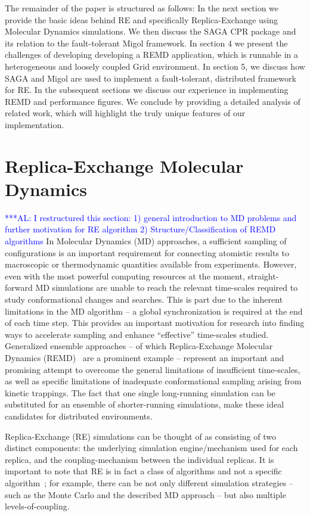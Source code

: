 \documentclass{rspublic}
\newcommand{\alnote}[1]{ {\textcolor{blue} { ***AL: #1 }}}
\newcommand{\alnote}[1]{}
\begin{document}
The remainder of the paper is structured as follows: In the next
section we provide the basic ideas behind RE and specifically
Replica-Exchange using Molecular Dynamics simulations.  We then
discuss the SAGA CPR package and its relation to the  fault-tolerant 
Migol framework. In section 4 we present
the challenges of developing developing a REMD application, which is runnable in 
a heterogeneous and loosely coupled Grid environment.
In section 5, we discuss how SAGA and Migol are used to implement 
a fault-tolerant, distributed framework for RE. In the subsequent sections we discuss
our experience in implementing REMD and performance figures. We
conclude by providing a detailed analysis of related work, which will
highlight the truly unique features of our implementation.

\section{Replica-Exchange Molecular Dynamics}
\alnote{I restructured this section: 1) general introduction to MD
  problems and further motivation for RE algorithm 2)
  Structure/Classification of REMD algorithms}  In Molecular
Dynamics (MD) approaches, a sufficient sampling of configurations is
an important requirement for connecting atomistic results to
macroscopic or thermodynamic quantities available from experiments.
However, even with the most powerful computing resources at the
moment, straight-forward MD simulations are unable to reach the
relevant time-scales required to study conformational changes and
searches. This is part due to the inherent limitations in the MD
algorithm -- a global synchronization is required at the end of each
time step.  This provides an important motivation for research into
finding ways to accelerate sampling and enhance ``effective''
time-scales studied. Generalized ensemble approaches -- of which
Replica-Exchange Molecular Dynamics (REMD)~\citep{Sugita:1999rm} are a
prominent example -- represent an important and promising attempt to
overcome the general limitations of insufficient time-scales, as well
as specific limitations of inadequate conformational sampling arising
from kinetic trappings.  The fact that one single long-running
simulation can be substituted for an ensemble of shorter-running
simulations, make these ideal candidates for distributed environments.

Replica-Exchange (RE) simulations can be thought of as consisting of
two distinct components: the underlying simulation engine/mechanism
used for each replica, and the coupling-mechanism between the
individual replicas.  It is important to note that RE is in fact a
class of algorithms and not a specific
algorithm~\citep{dpa-paper}; for example, there can be not only
different simulation strategies -- such as the Monte Carlo and the
described MD approach -- but also multiple levels-of-coupling.  
\end{document}
